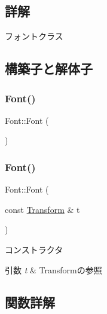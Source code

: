 \subsection{詳解}
フォントクラス 

\subsection{構築子と解体子}
\mbox{\label{class_font_a2af6642bc26eebff029c74d7827f5ee5}} 
\subsubsection{\texorpdfstring{Font()}{Font()}\hspace{0.1cm}{\footnotesize\ttfamily [1/2]}}
{\footnotesize\ttfamily Font\+::\+Font (\begin{DoxyParamCaption}{ }\end{DoxyParamCaption})\hspace{0.3cm}{\ttfamily [delete]}}

\mbox{\label{class_font_aa07b69b4e229b2e9efdf0ac49e7a2af1}} 
\subsubsection{\texorpdfstring{Font()}{Font()}\hspace{0.1cm}{\footnotesize\ttfamily [2/2]}}
{\footnotesize\ttfamily Font\+::\+Font (\begin{DoxyParamCaption}\item[{const \mbox{\hyperlink{class_transform}{Transform}} \&}]{t }\end{DoxyParamCaption})}



コンストラクタ 


\begin{DoxyParams}{引数}
{\em t} & Transformの参照 \\
\hline
\end{DoxyParams}


\subsection{関数詳解}
\mbox{\label{class_font_a47be569e73a4ba819bf4370463cf929b}} 
